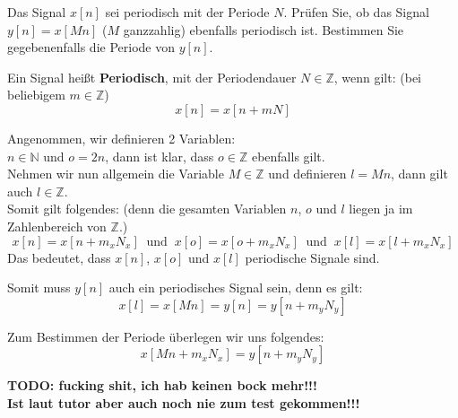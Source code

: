 \begin{uebsp}
\begin{Exercise}
Das Signal $x[n]$ sei periodisch mit der Periode $N$. Prüfen Sie, ob das Signal $y[n] = x[M n]$
($M$ ganzzahlig) ebenfalls periodisch ist. Bestimmen Sie gegebenenfalls die Periode von $y[n]$.
\end{Exercise}
\begin{Answer}
    \begin{uebsp_theory}
    Ein Signal heißt \textbf{Periodisch}, mit der Periodendauer $N\in\mathbb{Z}$, wenn gilt: (bei beliebigem $m\in \mathbb{Z}$)
    \[x[n]=x[n+mN]\]
    \end{uebsp_theory}

    Angenommen, wir definieren 2 Variablen:\\
    $n\in\mathbb{N}$ und $o=2n$, dann ist klar, dass $o\in\mathbb{Z}$ ebenfalls gilt.\\
    
    Nehmen wir nun allgemein die Variable $M\in\mathbb{Z}$ und definieren $l=Mn$, dann gilt auch $l\in\mathbb{Z}$.\\

    Somit gilt folgendes: (denn die gesamten Variablen $n$, $o$ und $l$ liegen ja im Zahlenbereich von $\mathbb{Z}$.)
    \[x[n]=x[n+m_xN_x]\;\;\text{und}\;\;x[o]=x[o+m_xN_x]\;\;\text{und}\;\;x[l]=x[l+m_xN_x]\]
    Das bedeutet, dass $x[n]$, $x[o]$ und $x[l]$ periodische Signale sind.
    
    Somit muss $y[n]$ auch ein periodisches Signal sein, denn es gilt:
    \[x[l]=x[Mn]=y[n]=y[n+m_yN_y]\]

    Zum Bestimmen der Periode überlegen wir uns folgendes:
    \[x[Mn+m_xN_x]=y[n+m_yN_y]\]


    \textbf{TODO: fucking shit, ich hab keinen bock mehr!!!\\Ist laut tutor aber auch noch nie zum test gekommen!!!}
    \end{Answer}
\end{uebsp}
